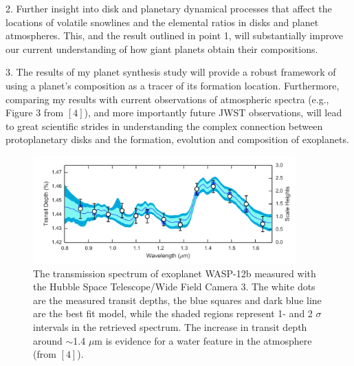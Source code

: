 \documentclass[12pt, letterpaper]{article}
\begin{document}
2. Further insight into disk and planetary dynamical processes that affect the locations of volatile snowlines and the elemental ratios in disks and planet atmospheres. This, and the result outlined in point 1, will substantially improve our current understanding of how giant planets obtain their compositions. 

3. The results of my planet synthesis study will provide a robust framework of using a planet's composition as a tracer of its formation location. Furthermore, comparing my results with current observations of atmospheric spectra (e.g., Figure 3 from $[4]$), and more importantly future JWST observations, will lead to great scientific strides in understanding the complex connection between protoplanetary disks and the formation, evolution and composition of exoplanets. 


\begin{figure}[h!]
\centering
\vspace{-0.2in}
\includegraphics[width=0.9\textwidth]{water_spectrum}
\vspace{-0.2in}
\caption{The transmission spectrum of exoplanet WASP-12b measured with the Hubble Space Telescope/Wide Field Camera 3. The white dots are the measured transit depths, the blue squares and dark blue line are the best fit model, while the shaded regions represent 1- and 2 $\sigma$ intervals in the retrieved spectrum. The increase in transit depth around $\sim$1.4 $\mu$m is evidence for a water feature in the atmosphere (from $[4]$).}
\label{fig:HLTau}
\end{figure}

\end{document}
